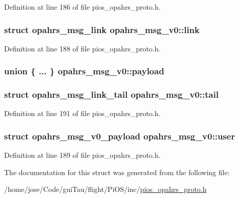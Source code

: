 Definition at line 186 of file pios\-\_\-opahrs\-\_\-proto.\-h.

\hypertarget{structopahrs__msg__v0_a0042c0b5e5ed2d74a40d5abc2bb8817f}{
\subsubsection[{link}]{\setlength{\rightskip}{0pt plus 5cm}struct {\bf opahrs\-\_\-msg\-\_\-link} opahrs\-\_\-msg\-\_\-v0\-::link}}\label{structopahrs__msg__v0_a0042c0b5e5ed2d74a40d5abc2bb8817f}


Definition at line 188 of file pios\-\_\-opahrs\-\_\-proto.\-h.

\hypertarget{structopahrs__msg__v0_a5d8bf554da50c900e0fcdad24cfae84e}{
\subsubsection[{payload}]{\setlength{\rightskip}{0pt plus 5cm}union \{ ... \}   opahrs\-\_\-msg\-\_\-v0\-::payload}}\label{structopahrs__msg__v0_a5d8bf554da50c900e0fcdad24cfae84e}
\hypertarget{structopahrs__msg__v0_a53d292d779748ac79bb2690b25417d12}{
\subsubsection[{tail}]{\setlength{\rightskip}{0pt plus 5cm}struct {\bf opahrs\-\_\-msg\-\_\-link\-\_\-tail} opahrs\-\_\-msg\-\_\-v0\-::tail}}\label{structopahrs__msg__v0_a53d292d779748ac79bb2690b25417d12}


Definition at line 191 of file pios\-\_\-opahrs\-\_\-proto.\-h.

\hypertarget{structopahrs__msg__v0_a04283c93537e31a776223a755f849b50}{
\subsubsection[{user}]{\setlength{\rightskip}{0pt plus 5cm}struct {\bf opahrs\-\_\-msg\-\_\-v0\-\_\-payload} opahrs\-\_\-msg\-\_\-v0\-::user}}\label{structopahrs__msg__v0_a04283c93537e31a776223a755f849b50}


Definition at line 189 of file pios\-\_\-opahrs\-\_\-proto.\-h.



The documentation for this struct was generated from the following file\-:\begin{DoxyCompactItemize}
\item 
/home/jose/\-Code/gui\-Tau/flight/\-Pi\-O\-S/inc/\hyperlink{pios__opahrs__proto_8h}{pios\-\_\-opahrs\-\_\-proto.\-h}\end{DoxyCompactItemize}
